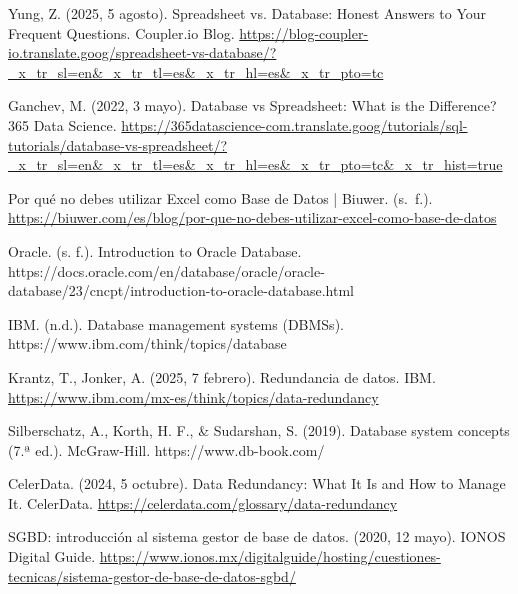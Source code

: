 \documentclass[12pt]{report}
\begin{document}
\begin{thebibliography}{99}
    Yung, Z. (2025, 5 agosto). Spreadsheet vs. Database: Honest Answers to Your Frequent Questions. Coupler.io Blog. \url{https://blog-coupler-io.translate.goog/spreadsheet-vs-database/?_x_tr_sl=en&_x_tr_tl=es&_x_tr_hl=es&_x_tr_pto=tc}

    Ganchev, M. (2022, 3 mayo). Database vs Spreadsheet: What is the Difference? 365 Data Science. \url{https://365datascience-com.translate.goog/tutorials/sql-tutorials/database-vs-spreadsheet/?_x_tr_sl=en&_x_tr_tl=es&_x_tr_hl=es&_x_tr_pto=tc&_x_tr_hist=true}

    Por qué no debes utilizar Excel como Base de Datos | Biuwer. (s. f.). \url{https://biuwer.com/es/blog/por-que-no-debes-utilizar-excel-como-base-de-datos}

    Oracle. (s. f.). Introduction to Oracle Database. https://docs.oracle.com/en/database/oracle/oracle-database/23/cncpt/introduction-to-oracle-database.html

    IBM. (n.d.). Database management systems (DBMSs). https://www.ibm.com/think/topics/database
    
    Krantz, T., Jonker, A. (2025, 7 febrero). Redundancia de datos. IBM. \url{https://www.ibm.com/mx-es/think/topics/data-redundancy}

    Silberschatz, A., Korth, H. F., & Sudarshan, S. (2019). Database system concepts (7.ª ed.). McGraw-Hill. https://www.db-book.com/
    
    CelerData. (2024, 5 octubre). Data Redundancy: What It Is and How to Manage It. CelerData. \url{https://celerdata.com/glossary/data-redundancy}

    SGBD: introducción al sistema gestor de base de datos. (2020, 12 mayo). IONOS Digital Guide. \url{https://www.ionos.mx/digitalguide/hosting/cuestiones-tecnicas/sistema-gestor-de-base-de-datos-sgbd/}
\end{thebibliography}
\end{document}
